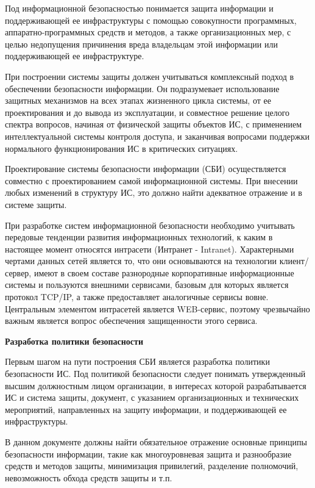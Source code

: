 Под информационной безопасностью понимается защита информации и поддерживающей ее инфраструктуры с помощью
совокупности программных, аппаратно-программных средств и методов, а также организационных мер, с целью недопущения
причинения вреда владельцам этой информации или поддерживающей ее инфраструктуре.

При построении системы защиты должен учитываться комплексный подход в обеспечении безопасности информации.
Он подразумевает использование защитных механизмов на всех этапах жизненного цикла системы, от ее проектирования
и до вывода из эксплуатации, и совместное решение целого спектра вопросов, начиная от физической защиты объектов ИС,
с применением интеллектуальной системы контроля доступа, и заканчивая вопросами поддержки нормального функционирования
ИС в критических ситуациях.

Проектирование системы безопасности информации (СБИ) осуществляется совместно с проектированием самой информационной системы.
При внесении любых изменений в структуру ИС, это должно найти адекватное отражение и в системе защиты.

При разработке систем информационной безопасности необходимо учитывать передовые тенденции развития информационных
технологий, к каким в настоящее момент относятся интрасети (Интранет - Intranet).
Характерными чертами данных сетей является то, что они основываются на технологии клиент/сервер, имеют в своем составе
разнородные корпоративные информационные системы и пользуются внешними сервисами, базовым для которых является
протокол TCP/IP, а также предоставляет аналогичные сервисы вовне. Центральным элементом интрасетей является
WEB-сервис, поэтому чрезвычайно важным является вопрос обеспечения защищенности этого сервиса.

\bigbreak
\textbf{Разработка политики безопасности}

Первым шагом на пути построения СБИ является разработка политики безопасности ИС.
Под политикой безопасности следует понимать утвержденный высшим должностным лицом организации, в
интересах которой разрабатывается ИС и система защиты, документ, с указанием организационных и технических мероприятий,
направленных на защиту информации, и поддерживающей ее инфраструктуры.

В данном документе должны найти обязательное отражение основные принципы безопасности информации,
такие как многоуровневая защита и разнообразие средств и методов защиты, минимизация привилегий, разделение полномочий,
невозможность обхода средств защиты и т.п.

